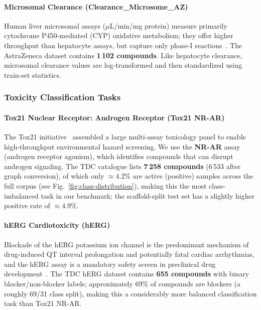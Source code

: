 \documentclass[journal]{IEEEtran}
\begin{document}
\paragraph{Microsomal Clearance (Clearance\_Microsome\_AZ)}
Human liver microsomal assays ($\mu$L/min/mg protein) measure primarily cytochrome P450-mediated (CYP) oxidative metabolism; they offer higher throughput than hepatocyte assays, but capture only phase-I reactions~\cite{obach2006trend}. The AstraZeneca dataset contains \textbf{1\,102 compounds}. Like hepatocyte clearance, microsomal clearance values are log-transformed and then standardized using train-set statistics.

\subsubsection{Toxicity Classification Tasks}

\paragraph{Tox21 Nuclear Receptor: Androgen Receptor (Tox21 NR-AR)}
The Tox21 initiative~\cite{tox21data} assembled a large multi-assay toxicology panel to enable high-throughput environmental hazard screening. We use the \textbf{NR-AR} assay (androgen receptor agonism), which identifies compounds that can disrupt androgen signaling. The TDC catalogue lists \textbf{7\,258 compounds} (6\,533 after graph conversion), of which only $\approx4.2\%$ are active (positive) samples across the full corpus (see Fig.~\ref{fig:class-distribution}), making this the most class-imbalanced task in our benchmark; the scaffold-split test set has a slightly higher positive rate of $\approx4.9\%$.


\paragraph{hERG Cardiotoxicity (hERG)}
Blockade of the hERG potassium ion channel is the predominant mechanism of drug-induced QT interval prolongation and potentially fatal cardiac arrhythmias, and the hERG assay is a mandatory safety screen in preclinical drug development~\cite{sanguinetti2006herg}. The TDC hERG dataset contains \textbf{655 compounds} with binary blocker/non-blocker labels; approximately 69\% of compounds are blockers (a roughly 69/31 class split), making this a considerably more balanced classification task than Tox21 NR-AR.
\end{document}
